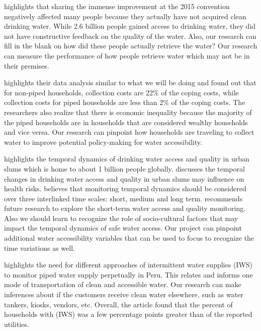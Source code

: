 \documentclass[10pt,twoside]{article}
\numberwithin{equation}{section}
\newcommand{\?}{\stackrel{?}{=}}
\begin{document}
\citet{tortajadaAchievingUniversalAccess2018} highlights that sharing the immense improvement at the 2015 convention negatively
affected many people because they actually have not acquired clean drinking water. While 2.6 billion people gained
access to drinking water, they did not have constructive feedback on the quality of the water. Also, our research can
fill in the blank on how did these people actually retrieve the water? Our research can measure the performance of how
people retrieve water which may not be in their premises.

\citet{amitMeasuringAffordabilityAccess2019} highlights their data analysis similar to what we will be doing and found out that for
non-piped households, collection costs are 22\% of the coping costs, while collection costs for piped households are
less than 2\% of the coping costs. The researchers also realize that there is economic inequality because the majority
of the piped households are in households that are considered wealthy households and vice versa. Our research can
pinpoint how households are traveling to collect water to improve potential policy-making for water accessibility.

\citet{priceDifferenceDayCan2019} highlights the temporal dynamics of drinking water access and quality in urban slums which
is home to about 1 billion people globally. \citet{priceDifferenceDayCan2019} discusses the temporal changes in drinking water
access and quality in urban slums may influence on health risks. \citet{priceDifferenceDayCan2019} believes that monitoring
temporal dynamics should be considered over three interlinked time scales: short, medium and long term.\citet{priceDifferenceDayCan2019} recommends future research to explore the short-term water access and quality monitoring. Also we should learn to recognize the role of socio-cultural factors that may impact the temporal dynamics of safe water access. Our project can pinpoint additional water accessibility variables that can be used to focus to recognize the time variations as well.  

\citet{rawasComparingUtilityreportedHours2020} highlights the need for different approaches of intermittent water supplies (IWS) to monitor piped water supply perpetually in Peru. This relates and informs one mode of transportation of clean and accessible water. Our research can make inferences about if the customers receive clean water elsewhere, such as water tankers, kiosks, vendors, etc. Overall, the article found that the percent of households with (IWS) was a few percentage points greater than of the reported utilities. 
\end{document}
